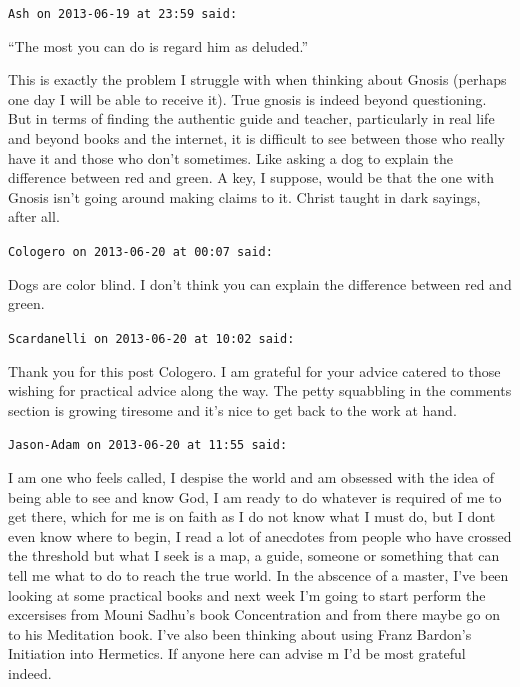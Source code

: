 \begin{footnotesize}
\begin{sffamily}
\texttt{Ash on 2013-06-19 at 23:59 said:}

``The most you can do is regard him as deluded.''

This is exactly the problem I struggle with when thinking about Gnosis (perhaps one day I will be able to receive it). True gnosis is indeed beyond questioning. But in terms of finding the authentic guide and teacher, particularly in real life and beyond books and the internet, it is difficult to see between those who really have it and those who don't sometimes. Like asking a dog to explain the difference between red and green. A key, I suppose, would be that the one with Gnosis isn't going around making claims to it. Christ taught in dark sayings, after all.

\hfill

\texttt{Cologero on 2013-06-20 at 00:07 said:}

Dogs are color blind. I don't think you can explain the difference between red and green.

\hfill

\texttt{Scardanelli on 2013-06-20 at 10:02 said:}

Thank you for this post Cologero. I am grateful for your advice catered to those wishing for practical advice along the way. The petty squabbling in the comments section is growing tiresome and it's nice to get back to the work at hand.

\hfill

\texttt{Jason-Adam on 2013-06-20 at 11:55 said:}

I am one who feels called, I despise the world and am obsessed with the idea of being able to see and know God, I am ready to do whatever is required of me to get there, which for me is on faith as I do not know what I must do, but I dont even know where to begin, I read a lot of anecdotes from people who have crossed the threshold but what I seek is a map, a guide, someone or something that can tell me what to do to reach the true world. In the abscence of a master, I've been looking at some practical books and next week I'm going to start perform the excersises from Mouni Sadhu's book Concentration and from there maybe go on to his Meditation book. I've also been thinking about using Franz Bardon's Initiation into Hermetics. If anyone here can advise m I'd be most grateful indeed.

\hfill


\end{sffamily}
\end{footnotesize}
